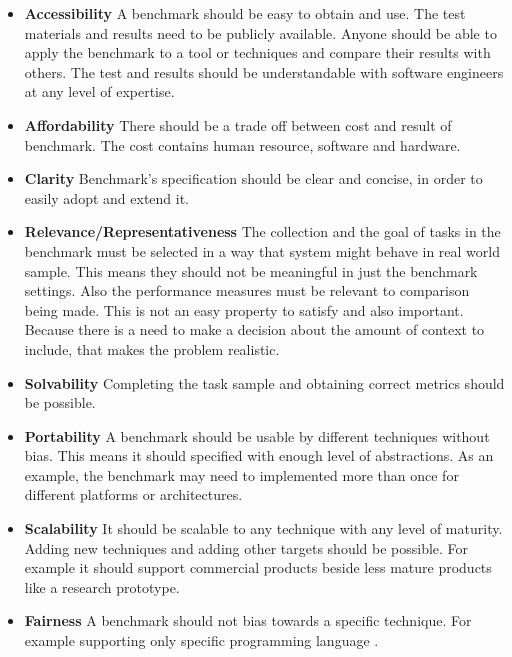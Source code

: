 \documentclass[authoryear,preprint]{sigplanconf}
\begin{document}
 \begin{itemize}
	\item \textbf{Accessibility} A benchmark should be easy to obtain and use. The test materials and results need to be publicly available. Anyone should be able to apply the benchmark to a tool or techniques and compare their results with others. The test and results should be understandable with software engineers at any level of expertise. 

	\item \textbf{Affordability} There should be a trade off between cost and result of benchmark. The cost contains human resource, software and hardware. 

	\item \textbf{Clarity} Benchmark's specification should be clear and concise, in order to easily adopt and extend it.
	
	\item \textbf{Relevance/Representativeness} The collection and the goal of tasks in the benchmark must be selected in a way that system might behave in real world sample. This means they should not be meaningful in just the benchmark settings. Also the performance measures must be relevant to comparison being made. This is not an easy property to satisfy and also important. Because there is a need to make a decision about the amount of context to include, that makes the problem realistic. 
	
	\item \textbf{Solvability} Completing the task sample and obtaining correct metrics should be possible. 
	
	\item \textbf{Portability} A benchmark should be usable by different techniques without bias. This means it should specified with enough level of abstractions. As an example, the benchmark may need to implemented more than once for different platforms or architectures. 
	
	\item \textbf{Scalability} It should be scalable to any technique with any level of maturity. Adding new techniques and adding other targets should be possible. For example it should support commercial products beside less mature products like a research prototype. 
	
	\item \textbf{Fairness} A benchmark should not bias towards a specific technique. For example supporting only specific programming language \cite{lu2005bugbench}.
\end{itemize}
\end{document}
